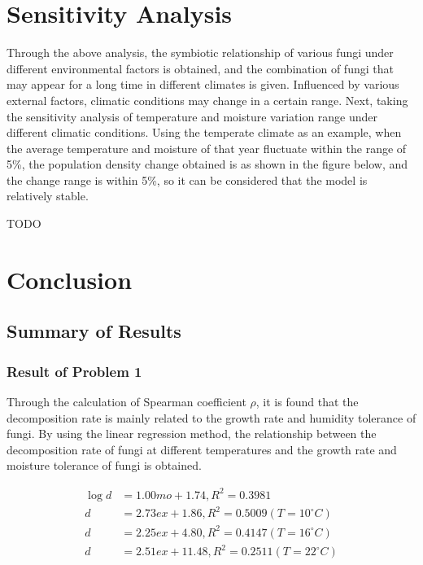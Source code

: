 \documentclass{mcmthesis}
\begin{document}
\section{Sensitivity Analysis }

Through the above analysis, the symbiotic relationship of various fungi under different environmental factors is obtained, and the combination of fungi that may appear for a long time in different climates is given. Influenced by various external factors, climatic conditions may change in a certain range. Next, taking the sensitivity analysis of temperature and moisture variation range under different climatic conditions. Using the temperate climate as an example, when the average temperature and moisture of that year fluctuate within the range of 5\%, the population density change obtained is as shown in the figure below, and the change range is within 5\%, so it can be considered that the model is relatively stable.

TODO

\section{Conclusion}

\subsection{Summary of Results}

\subsubsection{Result of Problem 1}

Through the calculation of Spearman coefficient $ \rho $, it is found that the decomposition rate  is mainly related to the growth rate and humidity tolerance of fungi. By using the linear regression method, the relationship between the decomposition rate of fungi at different temperatures and the growth rate and moisture tolerance of fungi is obtained.

\begin{equation}
  \begin{split}
    \log {d}&=1.00mo+1.74,R^2=0.3981 \\
    d&=2.73ex+1.86,R^2=0.5009 (T=10^{\circ}C) \\
    d&=2.25ex+4.80,R^2=0.4147 (T=16^{\circ}C) \\
    d&=2.51ex+11.48,R^2=0.2511 (T=22^{\circ}C)
  \end{split}
\end{equation}
\end{document}
